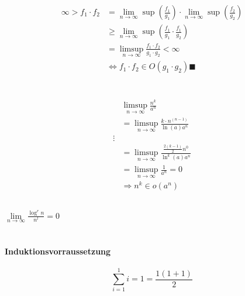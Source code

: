 \documentclass{article}
\begin{document}
    \begin{align*}
        \infty > f_1 \cdot f_2 &= \lim\limits_{n\rightarrow\infty}\sup(\frac{f_1}{g_1}) \cdot
        \lim\limits_{n\rightarrow\infty}\sup(\frac{f_2}{g_2})\\
        &\geq \lim\limits_{n\rightarrow\infty}\sup(\frac{f_1}{g_1}\cdot \frac{f_1}{g_2})\\
        &=\limsup\limits_{n\rightarrow\infty}\frac{f_1\cdot f_2}{g_1 \cdot g_2} < \infty\\
        &\Leftrightarrow f_1\cdot f_2\in O(g_1\cdot g_2) \blacksquare
    \end{align*}

    \newpage
    \section{}
    \subsection{}
    \begin{align*}
        &\limsup\limits_{n\rightarrow\infty}\frac{n^k}{a^n}\\
        &=\limsup\limits_{n\rightarrow\infty}\frac{k\cdot n^{(n-1)}}{\ln(a)a^n}\\
        \vdots\\
        &=\limsup\limits_{n\rightarrow\infty}\frac{\frac{2(k-1)}{2}n^0}{\ln^k(a)a^n}\\
        &=\limsup\limits_{n\rightarrow\infty}\frac{1}{a^n} =0\\
        &\Rightarrow n^k\in o(a^n)
    \end{align*}
    \subsection{}
    $\lim\limits_{n\rightarrow\infty}\frac{\log^rn}{n^l}=0$

    \section{}
    \subsection{}
    \paragraph{Induktionsvorraussetzung}
    \begin{equation*}
        \sum_{i=1}^1 i = 1 = \frac{1(1+1)}{2}
    \end{equation*}
\end{document}
